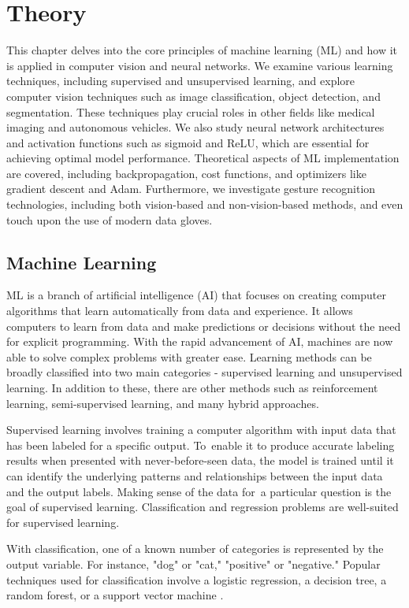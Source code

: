 \chapter{Theory}
This chapter delves into the core principles of machine learning (ML) and how it is applied in computer vision and neural networks. We examine various learning techniques, including supervised and unsupervised learning, and explore computer vision techniques such as image classification, object detection, and segmentation. These techniques play crucial roles in other fields like medical imaging and autonomous vehicles. We also study neural network architectures and activation functions such as sigmoid and ReLU, which are essential for achieving optimal model performance. Theoretical aspects of ML implementation are covered, including backpropagation, cost functions, and optimizers like gradient descent and Adam. Furthermore, we investigate gesture recognition technologies, including both vision-based and non-vision-based methods, and even touch upon the use of modern data gloves.


\section{Machine Learning}
ML is a branch of artificial intelligence (AI) that focuses on creating computer algorithms that learn automatically from data and experience. It allows computers to learn from data and make predictions or decisions without the need for explicit programming.
With the rapid advancement of AI, machines are now able to solve complex problems with greater ease. Learning methods can be broadly classified into two main categories - supervised learning and unsupervised learning. In addition to these, there are other methods such as reinforcement learning, semi-supervised learning, and many hybrid approaches.

Supervised learning involves training a computer algorithm with input data that has been labeled for a specific output. To enable it to produce accurate labeling results when presented with never-before-seen data, the model is trained until it can identify the underlying patterns and relationships between the input data and the output labels. Making sense of the data for a particular question is the goal of supervised learning. Classification and regression problems are well-suited for supervised learning. 


With classification, one of a known number of categories is represented by the output variable. For instance, "dog" or "cat," "positive" or "negative." Popular techniques used for classification involve a logistic regression, a decision tree, a random forest, or a support vector machine \cite{decisiontree}.


